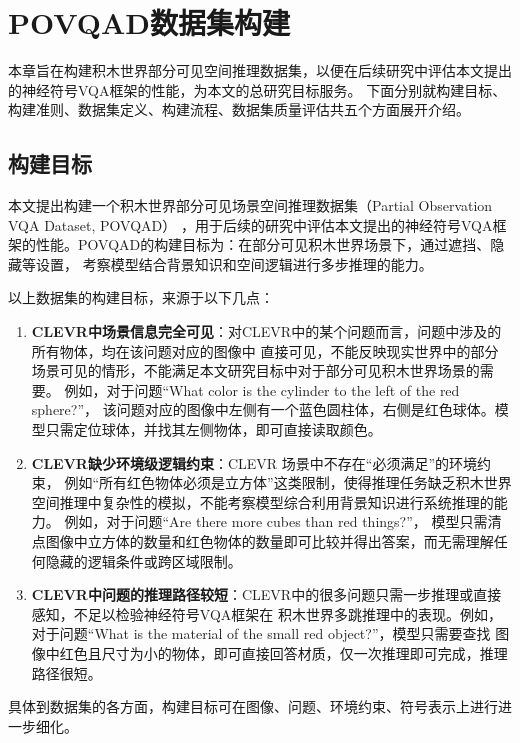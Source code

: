\chapter{POVQAD数据集构建}
\label{dataset}
本章旨在构建积木世界部分可见空间推理数据集，以便在后续研究中评估本文提出的神经符号VQA框架的性能，为本文的总研究目标服务。
下面分别就构建目标、构建准则、数据集定义、构建流程、数据集质量评估共五个方面展开介绍。
\section{构建目标}
本文提出构建一个积木世界部分可见场景空间推理数据集（Partial Observation VQA Data\-set, POVQAD）
，用于后续的研究中评估本文提出的神经符号VQA框架的性能。POVQAD的构建目标为：在部分可见积木世界场景下，通过遮挡、隐藏等设置，
考察模型结合背景知识和空间逻辑进行多步推理的能力。

以上数据集的构建目标，来源于以下几点：
\begin{enumerate}[nosep]
\item \textbf{CLEVR中场景信息完全可见}：对CLEVR中的某个问题而言，问题中涉及的所有物体，均在该问题对应的图像中
直接可见，不能反映现实世界中的部分场景可见的情形，不能满足本文研究目标中对于部分可见积木世界场景的需要。
例如，对于问题“What color is the cylinder to the left of the red sphere?”，
该问题对应的图像中左侧有一个蓝色圆柱体，右侧是红色球体。模型只需定位球体，并找其左侧物体，即可直接读取颜色。
\item \textbf{CLEVR缺少环境级逻辑约束}：CLEVR 场景中不存在“必须满足”的环境约束，
例如“所有红色物体必须是立方体”这类限制，使得推理任务缺乏积木世界空间推理中复杂性的模拟，不能考察模型综合利用背景知识进行系统推理的能力。
例如，对于问题“Are there more cubes than red things?”，
模型只需清点图像中立方体的数量和红色物体的数量即可比较并得出答案，而无需理解任何隐藏的逻辑条件或跨区域限制。
\item \textbf{CLEVR中问题的推理路径较短}：CLEVR中的很多问题只需一步推理或直接感知，不足以检验神经符号VQA框架在
积木世界多跳推理中的表现。例如，对于问题“What is the material of the small red object?”，模型只需要查找
图像中红色且尺寸为小的物体，即可直接回答材质，仅一次推理即可完成，推理路径很短。
\end{enumerate}
具体到数据集的各方面，构建目标可在图像、问题、环境约束、符号表示上进行进一步细化。
